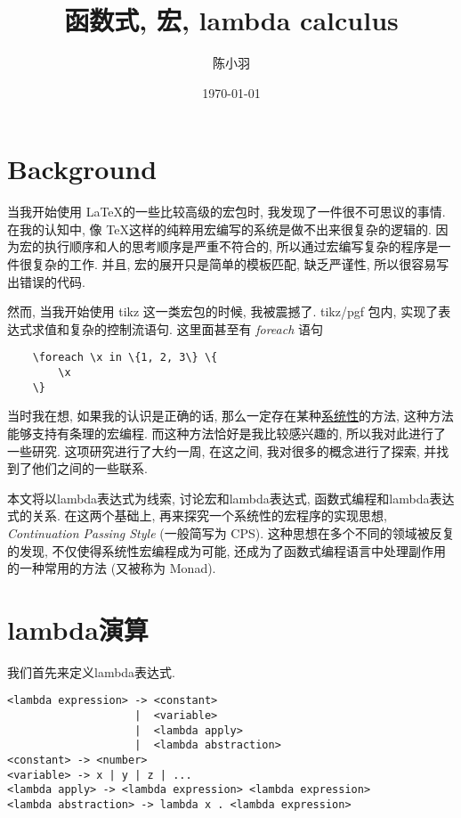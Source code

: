 \documentclass{article}
\author{陈小羽}
\date{\today}
\title{函数式, 宏, lambda calculus}
\begin{document}
\maketitle
\section{Background}
当我开始使用 \LaTeX 的一些比较高级的宏包时, 我发现了一件很不可思议的事情.
在我的认知中, 像 \TeX 这样的纯粹用宏编写的系统是做不出来很复杂的逻辑的.
因为宏的执行顺序和人的思考顺序是严重不符合的, 所以通过宏编写复杂的程序是一件很复杂的工作.
并且, 宏的展开只是简单的模板匹配, 缺乏严谨性, 所以很容易写出错误的代码.

然而, 当我开始使用 tikz 这一类宏包的时候, 我被震撼了. 
tikz/pgf 包内, 实现了表达式求值和复杂的控制流语句.
这里面甚至有 \emph{foreach} 语句

\begin{verbatim}
    \foreach \x in \{1, 2, 3\} \{
        \x
    \}
\end{verbatim}

当时我在想, 如果我的认识是正确的话, 那么一定存在某种\underline{系统性}的方法, 这种方法能够支持有条理的宏编程.
而这种方法恰好是我比较感兴趣的, 所以我对此进行了一些研究.
这项研究进行了大约一周, 在这之间, 我对很多的概念进行了探索, 并找到了他们之间的一些联系.

本文将以lambda表达式为线索, 讨论宏和lambda表达式, 函数式编程和lambda表达式的关系.
在这两个基础上, 再来探究一个系统性的宏程序的实现思想, \emph{Continuation Passing Style} (一般简写为 CPS).
这种思想在多个不同的领域被反复的发现, 不仅使得系统性宏编程成为可能, 还成为了函数式编程语言中处理副作用的一种常用的方法 (又被称为 Monad).

\section{lambda演算}
我们首先来定义lambda表达式.

\begin{tcolorbox}[title={define: lambda expression}]
\begin{verbatim}
<lambda expression> -> <constant> 
                    |  <variable> 
                    |  <lambda apply> 
                    |  <lambda abstraction> 
<constant> -> <number> 
<variable> -> x | y | z | ...
<lambda apply> -> <lambda expression> <lambda expression> 
<lambda abstraction> -> lambda x . <lambda expression>
\end{verbatim}
\end{tcolorbox}
\end{document}
